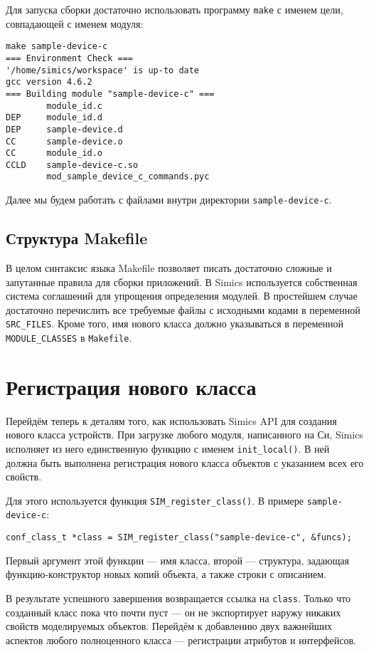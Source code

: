 Для запуска сборки достаточно использовать программу \texttt{make} с именем цели, совпадающей с именем модуля:
\begin{lstlisting}
make sample-device-c
=== Environment Check ===
'/home/simics/workspace' is up-to date
gcc version 4.6.2
=== Building module "sample-device-c" ===
        module_id.c
DEP     module_id.d
DEP     sample-device.d
CC      sample-device.o
CC      module_id.o
CCLD    sample-device-c.so
        mod_sample_device_c_commands.pyc
\end{lstlisting}

Далее мы будем работать с файлами внутри директории \texttt{sample-device-c}.

\subsection{Структура Makefile}

В целом синтаксис языка Makefile позволяет писать достаточно сложные и запутанные правила для сборки приложений. В Simics используется собственная система соглашений для упрощения определения модулей. В простейшем случае достаточно перечислить все требуемые файлы с исходными кодами в переменной \texttt{SRC_FILES}. Кроме того, имя нового класса должно указываться в переменной \texttt{MODULE_CLASSES} в \texttt{Makefile}.

\section{Регистрация нового класса}
Перейдём теперь к деталям того, как использовать Simics API для создания нового класса устройств.
При загрузке любого модуля, написанного на Си, Simics исполняет из него единственную функцию с именем \texttt{init_local()}. В ней должна быть выполнена регистрация нового класса объектов с указанием всех его свойств.

Для этого используется функция \texttt{SIM_register_class()}. В примере \texttt{sample-device-c}:

\begin{lstlisting}
conf_class_t *class = SIM_register_class("sample-device-c", &funcs);
\end{lstlisting}

Первый аргумент этой функции --- имя класса, второй --- структура, задающая функцию-конструктор новых копий объекта, а также строки с описанием.

В результате успешного завершения возвращается ссылка на \texttt{class}. Только что созданный класс пока что почти пуст --- он не экспортирует наружу никаких свойств моделируемых объектов. Перейдём к добавлению двух важнейших аспектов любого полноценного класса --- регистрации атрибутов и интерфейсов.

